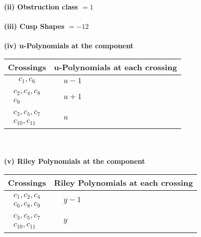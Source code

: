 \documentclass[1p]{elsarticle_modified}
\theoremstyle{definition}
\begin{document}
\flushleft \textbf{(ii) Obstruction class $= 1$}\\~\\
\flushleft \textbf{(iii) Cusp Shapes $= -12$}\\~\\
\newpage\renewcommand{\arraystretch}{1}
\flushleft \textbf{(iv) u-Polynomials at the component}\newline \\
\begin{tabular}{m{50pt}|m{274pt}}
Crossings & \hspace{64pt}u-Polynomials at each crossing \\
\hline $$\begin{aligned}c_{1},c_{6}\end{aligned}$$&$\begin{aligned}
&u-1
\end{aligned}$\\
\hline $$\begin{aligned}c_{2},c_{4},c_{8}\\c_{9}\end{aligned}$$&$\begin{aligned}
&u+1
\end{aligned}$\\
\hline $$\begin{aligned}c_{3},c_{5},c_{7}\\c_{10},c_{11}\end{aligned}$$&$\begin{aligned}
&u
\end{aligned}$\\
\hline
\end{tabular}\\~\\
\newpage\renewcommand{\arraystretch}{1}
\flushleft \textbf{(v) Riley Polynomials at the component}\newline \\
\begin{tabular}{m{50pt}|m{274pt}}
Crossings & \hspace{64pt}Riley Polynomials at each crossing \\
\hline $$\begin{aligned}c_{1},c_{2},c_{4}\\c_{6},c_{8},c_{9}\end{aligned}$$&$\begin{aligned}
&y-1
\end{aligned}$\\
\hline $$\begin{aligned}c_{3},c_{5},c_{7}\\c_{10},c_{11}\end{aligned}$$&$\begin{aligned}
&y
\end{aligned}$\\
\hline
\end{tabular}\\~\\
\end{document}
